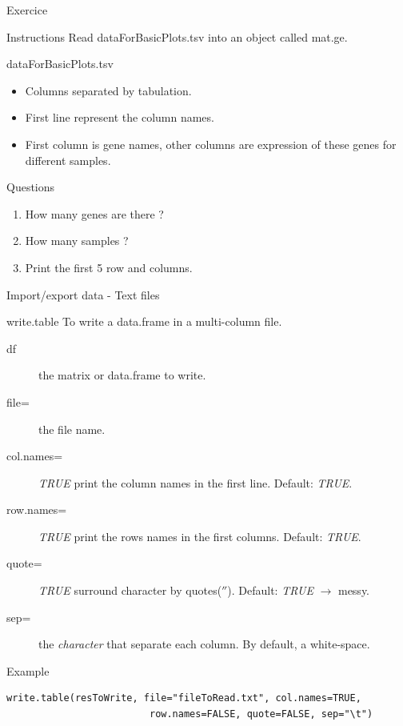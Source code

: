 \documentclass[10pt]{beamer}
\begin{document}
\begin{frame}{Exercice}
  \begin{block}{Instructions}
    Read {\sf dataForBasicPlots.tsv} into an object called {\sf mat.ge}.
  \end{block}
  
  \begin{block}{{\sf dataForBasicPlots.tsv}}
    \begin{itemize}
    \item Columns separated by tabulation.
    \item First line represent the column names.
    \item First column is gene names, other columns are expression of these genes for different samples.
    \end{itemize}
  \end{block}
  
  \begin{block}{Questions}
    \begin{enumerate}
    \item How many genes are there ?
    \item How many samples ?
    \item Print the first 5 row and columns.
    \end{enumerate}
  \end{block}

\end{frame}


\begin{frame}[fragile,shrink=10]{Import/export data - Text files}
  \begin{block}{{\sf write.table}}
    To write a {\sf data.frame} in a multi-column file.
    \begin{description}
    \item[df] the {\sf matrix} or {\sf data.frame} to write.
    \item[file=] the file name.
    \item[col.names=] {\it TRUE} print the column names in the first line. Default: {\it TRUE}.
    \item[row.names=] {\it TRUE} print the rows names in the first columns. Default: {\it TRUE}.
    \item[quote=] {\it TRUE} surround {\sf character} by quotes($''$). Default: {\it TRUE} $\rightarrow$ messy. 
    \item[sep=] the {\it character} that separate each column. By default, a white-space.
    \end{description}
  \end{block}
  \begin{exampleblock}{Example}
\begin{verbatim}
write.table(resToWrite, file="fileToRead.txt", col.names=TRUE, 
                         row.names=FALSE, quote=FALSE, sep="\t")
\end{verbatim}  
  \end{exampleblock}
\end{frame}
\end{document}

